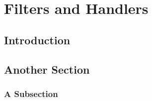 \chapter{Filters and Handlers}
\label{filters_and_handlers}

\section{Introduction}
\label{introduction}

\section{Another Section}

\subsection{A Subsection}
